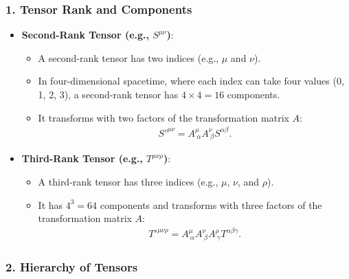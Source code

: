\documentclass[12pt]{book}
\begin{document}
            \subsubsection{1. Tensor Rank and Components}
                \begin{itemize}
                    \item \textbf{Second-Rank Tensor (e.g., \( S^{\mu \nu} \))}:
                    \begin{itemize}
                        \item A second-rank tensor has two indices (e.g., \( \mu \) and \( \nu \)).
                        \item In four-dimensional spacetime, where each index can take four values (0, 1, 2, 3), a second-rank tensor has \( 4 \times 4 = 16 \) components.
                        \item It transforms with two factors of the transformation matrix \( A \):
                        \begin{align}
                        S'^{\mu \nu} = A^\mu_{\ \alpha} A^\nu_{\ \beta} S^{\alpha \beta}.
                        \end{align}
                        \end{itemize}
                
                    \item \textbf{Third-Rank Tensor (e.g., \( T^{\mu \nu \rho} \))}:
                    \begin{itemize}
                        \item A third-rank tensor has three indices (e.g., \( \mu \), \( \nu \), and \( \rho \)).
                        \item It has \( 4^3 = 64 \) components and transforms with three factors of the transformation matrix \( A \):
                        \begin{align}
                        T'^{\mu \nu \rho} = A^\mu_{\ \alpha} A^\nu_{\ \beta} A^\rho_{\ \gamma} T^{\alpha \beta \gamma}.
                        \end{align}
                    \end{itemize}
                \end{itemize}
            
            \subsubsection{2. Hierarchy of Tensors}
            
\end{document}

